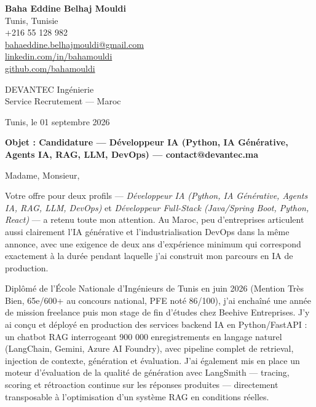 \documentclass[a4paper,11pt]{article}
\begin{document}
\begin{flushright}
{\bfseries Baha Eddine Belhaj Mouldi}\\
Tunis, Tunisie\\
+216 55 128 982\\
\href{mailto:bahaeddine.belhajmouldi@gmail.com}{bahaeddine.belhajmouldi@gmail.com}\\
\href{https://linkedin.com/in/bahamouldi}{linkedin.com/in/bahamouldi}\\
\href{https://github.com/bahamouldi}{github.com/bahamouldi}
\end{flushright}

\vspace{0.8cm}

\begin{flushleft}
DEVANTEC Ingénierie\\
Service Recrutement — Maroc

\vspace{0.8cm}

Tunis, le 01 septembre 2026

\vspace{0.6cm}

{\bfseries Objet : Candidature — Développeur IA (Python, IA Générative, Agents IA, RAG, LLM, DevOps) — contact@devantec.ma}
\end{flushleft}

\vspace{0.6cm}

Madame, Monsieur,

Votre offre pour deux profils — \textit{Développeur IA (Python, IA Générative, Agents IA, RAG, LLM, DevOps)} et \textit{Développeur Full-Stack (Java/Spring Boot, Python, React)} — a retenu toute mon attention. Au Maroc, peu d'entreprises articulent aussi clairement l'IA générative et l'industrialisation DevOps dans la même annonce, avec une exigence de deux ans d'expérience minimum qui correspond exactement à la durée pendant laquelle j'ai construit mon parcours en IA de production.

Diplômé de l'École Nationale d'Ingénieurs de Tunis en juin 2026 (Mention Très Bien, 65e/600+ au concours national, PFE noté 86/100), j'ai enchaîné une année de mission freelance puis mon stage de fin d'études chez Beehive Entreprises. J'y ai conçu et déployé en production des services backend IA en Python/FastAPI : un chatbot RAG interrogeant 900 000 enregistrements en langage naturel (LangChain, Gemini, Azure AI Foundry), avec pipeline complet de retrieval, injection de contexte, génération et évaluation. J'ai également mis en place un moteur d'évaluation de la qualité de génération avec LangSmith — tracing, scoring et rétroaction continue sur les réponses produites — directement transposable à l'optimisation d'un système RAG en conditions réelles.
\end{document}

